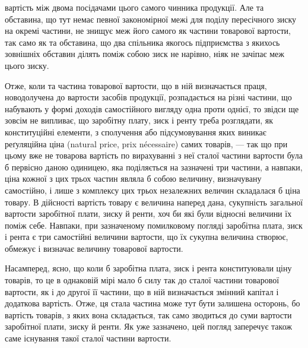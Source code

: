 \parcont{}  %
вартість між двома посідачами цього самого чинника продукції. Але та обставина,
що тут немає певної закономірної межі для поділу пересічного зиску
на окремі частини, не знищує меж його самого як частини товарової вартости,
так само як та обставина, що два спільника якогось підприємства з якихось
зовнішніх обставин ділять поміж собою зиск не нарівно, ніяк не зачіпає меж
цього зиску.

Отже, коли та частина товарової вартости, що в ній визначається праця,
новодолучена до вартости засобів продукції, розпадається на різні частини, що
набувають у формі доходів самостійного вигляду одна проти однієї, то звідси ще
зовсім не випливає, що заробітну плату, зиск і ренту треба розглядати, як
конституційні елементи, з сполучення або підсумовування яких виникає реґуляційна
ціна (natural price, prix nécessaire) самих товарів, — так що при цьому
вже не товарова вартість по вирахуванні з неї сталої частини вартости була б
первісно даною одиницею, яка поділяється на зазначені три частини, а навпаки,
ціна кожної з цих трьох частин являла б собою величину, визначувану самостійно,
і лише з комплексу цих трьох незалежних величин складалася б ціна
товару. В дійсності вартість товару є величина наперед дана, сукупність загальної
вартости заробітної плати, зиску й ренти, хоч би які були відносні величини їх
поміж себе. Навпаки, при зазначеному помилковому погляді заробітна плата,
зиск і рента є три самостійні величини вартости, що їх сукупна величина
створює, обмежує і визначає величину товарової вартости.

Насамперед, ясно, що коли б заробітна плата, зиск і рента конституювали
ціну товарів, то це в однаковій мірі мало б силу так до сталої частини товарової
вартости, як і до другої її частини, що в ній визначається змінний капітал
і додаткова вартість. Отже, ця стала частина може тут бути залишена
осторонь, бо вартість товарів, з яких вона складається, так само зводиться до
суми вартости заробітної плати, зиску й ренти. Як уже зазначено, цей погляд
заперечує також саме існування такої сталої частини вартости.

